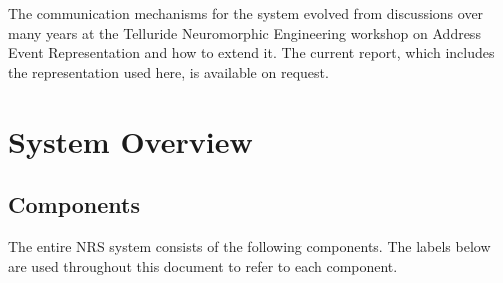 \documentclass[pdftex,a4paper]{article}
\begin{document}
The communication mechanisms for the system evolved from discussions
over many years at the Telluride Neuromorphic Engineering workshop on
Address Event Representation and how to extend it. The current report,
which includes the representation used here, is available on request.

\section{System Overview}

\subsection{Components}

The entire NRS system consists of the following components. The labels
below are used throughout this document to refer to each
component.
\end{document}
